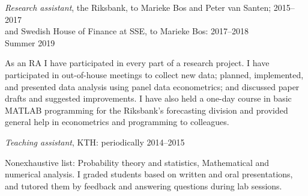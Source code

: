 \documentclass[a4paper,
10pt]{article}
\renewcommand{\year}[1]{\hfill#1\ignorespaces}
\newenvironment{lista}{\vspace*{-9pt}\begin{adjustwidth}{24pt}{0pt}}{\end{adjustwidth}\vspace*{-9pt}}
\newenvironment{lista2}{\vspace*{-12pt}\begin{adjustwidth}{24pt}{0pt}}{\end{adjustwidth}\vspace*{-12pt}}
\begin{document}
\emph{Research assistant}, the Riksbank, to Mar\-ieke Bos and Peter van Santen; \year{2015--2017}\\
and Swedish House of Finance at SSE, to Marieke Bos: \year{2017--2018}\\
\phantom{hej}  \year{Summer 2019}
\begin{lista}
As an RA I have participated in every part of a research project. I have participated in out-of-house meetings to collect new data; planned, implemented, and presented data analysis using panel data econometrics; and discussed paper drafts and suggested improvements. I have also held a one-day course in basic MATLAB programming for the Riksbank's forecasting division and provided general help in econometrics and programming to colleagues.\\
\end{lista}
\iffalse
\begin{lista}
I have also worked with: Bo Becker, Itzhak Ben-David, Emily Breza, Chlo\'e Le Coq, Andres Liberman, Kurt Mitman, Leonard Nakamura, Stan Rabinovich, Kasper Roszbach, David Vestin.
\end{lista}
\fi

\emph{Teaching assistant}, KTH: \year{periodically 2014--2015}
\begin{lista2}
Nonexhaustive list: Probability theory and statistics, Mathematical and numerical analysis. I graded students based on written and oral presentations, and tutored them by feedback and answering questions during lab sessions. %
\end{lista2}


\newpage
\end{document}
